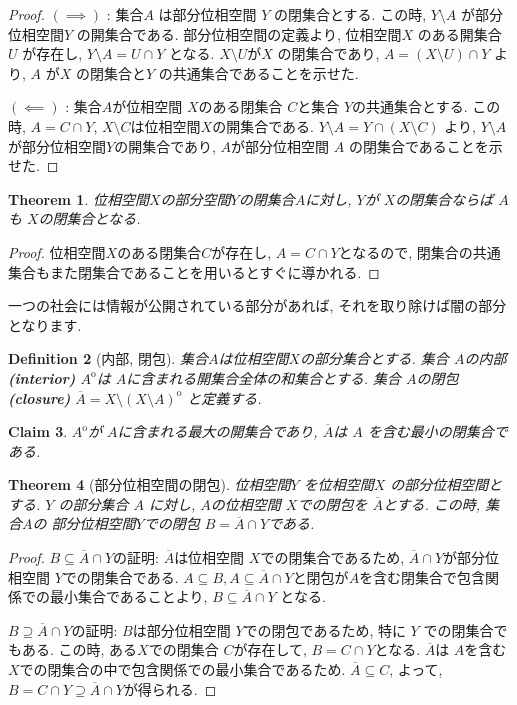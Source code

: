 \documentclass[lualatex]{ltjsbook}
\newcommand{\cl}[1]{\overline{ #1}  }
\newcommand{\Int}[1]{#1 ^{\mathrm{o}} }
\newtheorem{theorem}{Theorem}[chapter]
\newtheorem{definition}[theorem]{Definition}
\newtheorem{claim}[theorem]{Claim}
\theoremstyle{remark}
\theoremstyle{plain}
\begin{document}
\begin{proof}
	$\left( \implies \right) $ : 集合$A$ は部分位相空間 $Y$ の閉集合とする. 
	この時,  $Y\setminus A$ が部分位相空間$Y$ の開集合である.
	部分位相空間の定義より,  位相空間$X$ のある開集合 $U$ が存在し,  $Y\setminus A = U \cap Y$ となる. 
	$X\setminus U$が$X$ の閉集合であり,  $A = \left( X \setminus U \right) \cap Y$ より,  $A$ が$X$ の閉集合と$Y$ の共通集合であることを示せた.
	
	$\left( \impliedby \right) $ : 集合$A$が位相空間 $X$のある閉集合 $C$と集合 $Y$の共通集合とする.
	この時,  $A=C\cap Y$,   $X\setminus C$は位相空間$X$の開集合である.
	$Y\setminus A = Y\cap \left( X \setminus C \right) $  より,  $Y\setminus A$が部分位相空間$Y$の開集合であり,   $A$が部分位相空間 $A$ の閉集合であることを示せた.
\end{proof}

\begin{theorem}
\label{the:closedset}
	位相空間$X$の部分空間$Y$の閉集合$A$に対し,   $Y$が $X$の閉集合ならば $A$も $X$の閉集合となる.
\end{theorem}

\begin{proof}
	位相空間$X$のある閉集合$C$が存在し,  $A = C\cap Y$となるので,  閉集合の共通集合もまた閉集合であることを用いるとすぐに導かれる.
\end{proof}

一つの社会には情報が公開されている部分があれば,  それを取り除けば闇の部分となります.

\begin{definition}[内部,  閉包]
	集合$A$は位相空間$X$の部分集合とする. 
	集合 $A$の内部\textbf{(interior)} $\Int{A}$は $A$に含まれる開集合全体の和集合とする. 
	集合 $A$の閉包\textbf{(closure)} $\cl{A}= X \setminus\Int{ \left( X\setminus A \right)}$ と定義する.
\end{definition}

\begin{claim}
	$\Int{A}$が $A$に含まれる最大の開集合であり,   $\cl{A}$は $A$ を含む最小の閉集合である.
\end{claim}

\begin{theorem}[部分位相空間の閉包]
	位相空間$Y$ を位相空間$X$ の部分位相空間とする. 
	$Y$ の部分集合 $A$ に対し,  $A$の位相空間 $X$での閉包を $\cl{A}$とする.
	この時,  集合$A$の 部分位相空間$Y$での閉包 $B= \cl{A} \cap Y$である.
\end{theorem}

\begin{proof}
	$B \subseteq \cl{A} \cap Y $の証明:  $\cl{A}$は位相空間 $X$での閉集合であるため,   $\cl{A} \cap Y $が部分位相空間 $Y$での閉集合である.  
	$A \subseteq B,  A \subseteq \cl{A} \cap Y$と閉包が$A$を含む閉集合で包含関係での最小集合であることより,  $B \subseteq \cl{A} \cap Y$ となる.

	$B \supseteq \cl{A} \cap Y$の証明:  $B$は部分位相空間 $Y$での閉包であるため,  特に $Y$ での閉集合でもある. 
	この時,  ある$X$での閉集合 $C$が存在して,   $B=C \cap Y$となる.  
	$\cl{A}$は $A$を含む $X$での閉集合の中で包含関係での最小集合であるため. 
	$\cl{A} \subseteq C$,  よって,   $B = C \cap Y \supseteq \cl{A} \cap Y$が得られる.
\end{proof}
\end{document}
